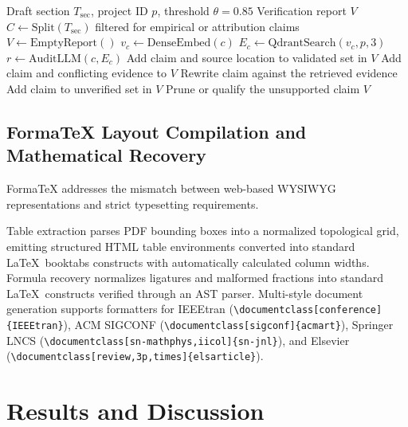 \documentclass[conference]{IEEEtran}
\begin{document}
\begin{algorithm}[!t]
\caption{Real-Time Claim Extraction and Multi-Hop Grounding}
\label{alg:fact}
\begin{algorithmic}[1]
\Require Draft section $T_{\mathrm{sec}}$, project ID $p$, threshold $\theta=0.85$
\Ensure Verification report $V$
\State $C\gets\mathrm{Split}(T_{\mathrm{sec}})$ filtered for empirical or attribution claims
\State $V\gets\mathrm{EmptyReport}()$
\State $v_c\gets\mathrm{DenseEmbed}(c)$
\State $E_c\gets\mathrm{QdrantSearch}(v_c,p,3)$
\State $r\gets\mathrm{AuditLLM}(c,E_c)$
\State Add claim and source location to validated set in $V$
\State Add claim and conflicting evidence to $V$
\State Rewrite claim against the retrieved evidence
\Else
\State Add claim to unverified set in $V$
\State Prune or qualify the unsupported claim
\EndIf
\EndFor
\State \Return $V$
\end{algorithmic}
\end{algorithm}

\subsection{FormaTeX Layout Compilation and Mathematical Recovery}
FormaTeX addresses the mismatch between web-based WYSIWYG representations and strict typesetting requirements.

 Table extraction parses PDF bounding boxes into a normalized topological grid, emitting structured HTML table environments converted into standard \LaTeX\ booktabs constructs with automatically calculated column widths. Formula recovery normalizes ligatures and malformed fractions into standard \LaTeX\ constructs verified through an AST parser. Multi-style document generation supports formatters for IEEEtran (\verb|\documentclass[conference]{IEEEtran}|), ACM SIGCONF (\verb|\documentclass[sigconf]{acmart}|), Springer LNCS (\verb|\documentclass[sn-mathphys,iicol]{sn-jnl}|), and Elsevier (\verb|\documentclass[review,3p,times]{elsarticle}|).

\section{Results and Discussion}
\end{document}
